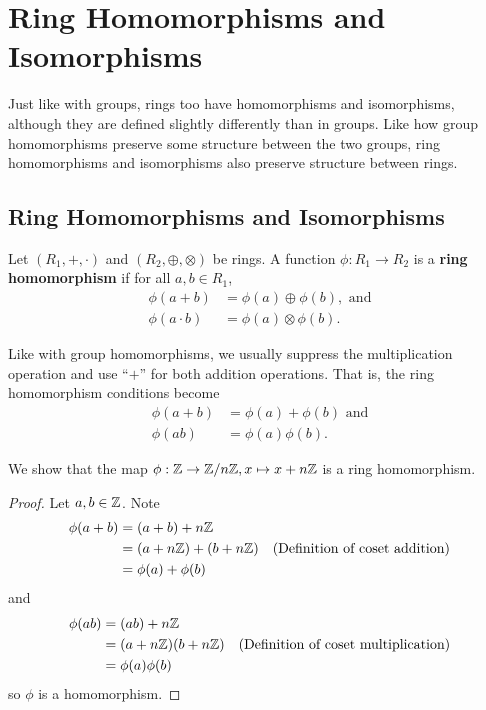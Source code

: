 \chapter{Ring Homomorphisms and Isomorphisms}
Just like with groups, rings too have homomorphisms and isomorphisms, although they are defined slightly differently than in groups. Like how group homomorphisms preserve some structure between the two groups, ring homomorphisms and isomorphisms also preserve structure between rings.

\section{Ring Homomorphisms and Isomorphisms}
\begin{definition}
    Let $(R_1, +, \cdot)$ and $(R_2, \oplus, \otimes)$ be rings. A function $\phi: R_1 \to R_2$ is a \textbf{ring homomorphism} if for all $a, b \in R_1$,
    \begin{align*}
        \phi(a+b) &= \phi(a) \oplus \phi(b), \text{ and}\\
        \phi(a\cdot b) &= \phi(a)\otimes\phi(b).
    \end{align*}
\end{definition}
\begin{remark}
    Like with group homomorphisms, we usually suppress the multiplication operation and use ``$+$'' for both addition operations. That is, the ring homomorphism conditions become
    \begin{align*}
        \phi(a+b) &= \phi(a) + \phi(b) \text{ and}\\
        \phi(ab) &= \phi(a)\phi(b).
    \end{align*}
\end{remark}

\begin{example}
     We show that the map $\phi: \mathbb{Z} \to \mathbb{Z}/n\mathbb{Z}, x \mapsto x + n\mathbb{Z}$ is a ring homomorphism.
     
     \begin{proof}
        Let $a, b \in \mathbb{Z}$. Note
        \begin{align*}
            \phi(a+b) &= (a+b) + n\mathbb{Z}\\
            &= (a + n\mathbb{Z}) + (b + n\mathbb{Z}) & (\text{Definition of coset addition})\\
            &=\phi(a)+\phi(b)
        \end{align*}
        and
        \begin{align*}
            \phi(ab) &= (ab) + n\mathbb{Z}\\
            &= (a + n\mathbb{Z})(b + n\mathbb{Z}) & (\text{Definition of coset multiplication})\\
            &= \phi(a)\phi(b)
        \end{align*}
        so $\phi$ is a homomorphism.
     \end{proof}
\end{example}

